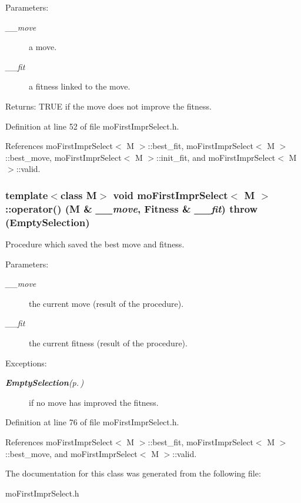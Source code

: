 \begin{Desc}
\item[Parameters:]
\begin{description}
\item[{\em \_\-\_\-move}]a move. \item[{\em \_\-\_\-fit}]a fitness linked to the move. \end{description}
\end{Desc}
\begin{Desc}
\item[Returns:]TRUE if the move does not improve the fitness. \end{Desc}


Definition at line 52 of file mo\-First\-Impr\-Select.h.

References mo\-First\-Impr\-Select$<$ M $>$::best\_\-fit, mo\-First\-Impr\-Select$<$ M $>$::best\_\-move, mo\-First\-Impr\-Select$<$ M $>$::init\_\-fit, and mo\-First\-Impr\-Select$<$ M $>$::valid.
\subsubsection{\setlength{\rightskip}{0pt plus 5cm}template$<$class M$>$ void {\bf mo\-First\-Impr\-Select}$<$ M $>$::operator() (M \& {\em \_\-\_\-move}, {\bf Fitness} \& {\em \_\-\_\-fit})  throw ({\bf Empty\-Selection})\hspace{0.3cm}{\tt  [inline]}}\label{classmo_first_impr_select_3be12cf4cbaed00df7c4fa735b2c0a95}


Procedure which saved the best move and fitness. 

\begin{Desc}
\item[Parameters:]
\begin{description}
\item[{\em \_\-\_\-move}]the current move (result of the procedure). \item[{\em \_\-\_\-fit}]the current fitness (result of the procedure). \end{description}
\end{Desc}
\begin{Desc}
\item[Exceptions:]
\begin{description}
\item[{\em {\bf Empty\-Selection}{\rm (p.\,\pageref{class_empty_selection})}}]if no move has improved the fitness. \end{description}
\end{Desc}


Definition at line 76 of file mo\-First\-Impr\-Select.h.

References mo\-First\-Impr\-Select$<$ M $>$::best\_\-fit, mo\-First\-Impr\-Select$<$ M $>$::best\_\-move, and mo\-First\-Impr\-Select$<$ M $>$::valid.

The documentation for this class was generated from the following file:\begin{CompactItemize}
\item 
mo\-First\-Impr\-Select.h\end{CompactItemize}
